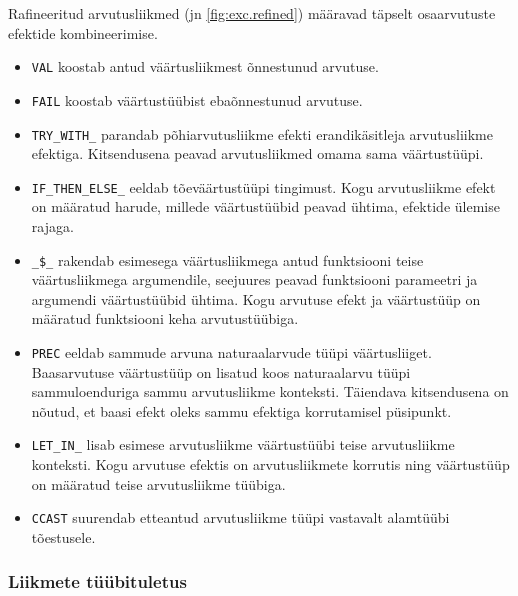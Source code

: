 \documentclass[a4paper,12pt]{article}
\begin{document}
Rafineeritud arvutusliikmed (jn \ref{fig:exc.refined}) määravad täpselt osaarvutuste efektide kombineerimise.
\begin{itemize}
\item {\tt VAL} koostab antud väärtusliikmest õnnestunud arvutuse.
\item {\tt FAIL} koostab väärtustüübist ebaõnnestunud arvutuse.
\item {\tt TRY_WITH_} parandab põhiarvutusliikme efekti erandikäsitleja arvutusliikme efektiga. Kitsendusena peavad arvutusliikmed omama sama väärtustüüpi.
\item {\tt IF_THEN_ELSE_} eeldab tõeväärtustüüpi tingimust. Kogu arvutusliikme efekt on määratud harude, millede väärtustüübid peavad ühtima, efektide ülemise rajaga.
\item {\tt _\$_} rakendab esimesega väärtusliikmega antud funktsiooni teise väärtusliikmega argumendile, seejuures peavad funktsiooni parameetri ja argumendi väärtustüübid ühtima. Kogu arvutuse efekt ja väärtustüüp on määratud funktsiooni keha arvutustüübiga. 
\item {\tt PREC} eeldab sammude arvuna naturaalarvude tüüpi väärtusliiget. Baasarvutuse väärtustüüp on lisatud koos naturaalarvu tüüpi sammuloenduriga sammu arvutusliikme konteksti. Täiendava kitsendusena on nõutud, et baasi efekt oleks sammu efektiga korrutamisel püsipunkt.
\item {\tt LET_IN_} lisab esimese arvutusliikme väärtustüübi teise arvutusliikme konteksti. Kogu arvutuse efektis on arvutusliikmete korrutis ning väärtustüüp on määratud teise arvutusliikme tüübiga.
\item {\tt CCAST} suurendab etteantud arvutusliikme tüüpi vastavalt alamtüübi tõestusele.
\end{itemize}


\subsubsection{Liikmete tüübituletus}\label{sssec:exc.infer-type}
\end{document}

